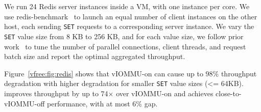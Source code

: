     




We run 24 Redis server instances inside a VM, with one instance per core. 
We use redis-benchmark~\cite{redis-benchmark} to launch an equal number of client instances on the other host,
    each sending \texttt{SET} requests to a corresponding server instance. 
We vary the \texttt{SET} value size from 8 KB to 256 KB, and 
    for each value size, we follow prior work~\cite{Rubin2024FastSafe} 
    to tune the number of parallel connections, client threads, and request batch size
    and report the optimal aggregated throughput.


Figure~\ref{vfree:fig:redis} shows that vIOMMU-on
can cause up to $98\%$ throughput degradation
with higher degradation for smaller \texttt{SET} value sizes (<= 64KB).
\vfreebrand improves throughput by up to 74$\times$ over vIOMMU-on 
    and achieves close-to-vIOMMU-off performance, with at most 6\% gap.



